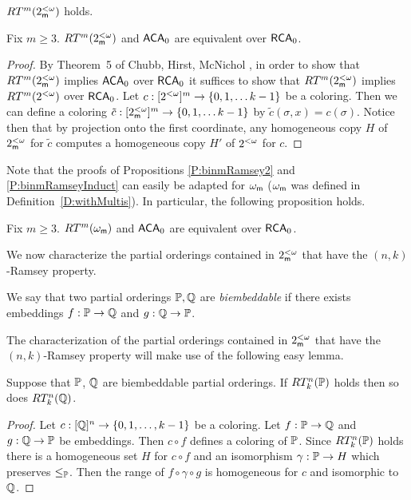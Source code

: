 \begin{cor}\label{C:binmRamsey}
$RT^m(2^{<\omega}_{\mathsf{m}})$ holds.
\end{cor}

\begin{thm}\label{T:binm&ACA}
Fix $m\geq 3$.  $RT^m(2^{<\omega}_{\mathsf{m}})$ and $\mathsf{ACA}_0$ are equivalent over $\mathsf{RCA}_0$.
\end{thm}
\begin{proof}
By Theorem~5 of Chubb, Hirst, McNichol \cite{CHM},
in order to show that $RT^m(2^{<\omega}_{\mathsf{m}})$ implies $\mathsf{ACA}_0$ over $\mathsf{RCA}_0$
it suffices to show that $RT^m(2^{<\omega}_{\mathsf{m}})$ implies $RT^m(2^{<\omega})$ over $\mathsf{RCA}_0$.
Let $c:[2^{<\omega}]^m\to\{0,1,\ldots k-1\}$ be a coloring.
Then we can define a coloring $\tilde{c}:[2^{<\omega}_{\mathsf{m}}]^m\to\{0,1,\ldots k-1\}$
by $\tilde{c}(\sigma,x)=c(\sigma)$.
Notice then that by projection onto the first coordinate,
any homogeneous copy $H$ of $2^{<\omega}_{\mathsf{m}}$ for $\tilde{c}$
computes a homogeneous copy $H'$ of $2^{<\omega}$ for $c$.
\end{proof}

Note that the proofs of Propositions \ref{P:binmRamsey2} and \ref{P:binmRamseyInduct}
can easily be adapted for $\omega_\mathsf{m}$
($\omega_\mathsf{m}$ was defined in Definition~\ref{D:withMultis}).
In particular, the following proposition holds.
\begin{prop}\label{P:omegamRamsey}
Fix $m\geq 3$.  $RT^m(\omega_\mathsf{m})$ and $\mathsf{ACA}_0$ are equivalent over $\mathsf{RCA}_0$.
\end{prop}

We now characterize the partial orderings contained in $2^{<\omega}_{\mathsf{m}}$
that have the $(n,k)$-Ramsey property.

\begin{definition}
We say that two partial orderings $\mathbb{P},\mathbb{Q}$ are \textit{biembeddable} if
there exists embeddings $f:\mathbb{P}\to\mathbb{Q}$ and $g:\mathbb{Q}\to\mathbb{P}$.
\end{definition}

The characterization of the partial orderings contained in $2^{<\omega}_{\mathsf{m}}$
that have the $(n,k)$-Ramsey property will make use of the following easy lemma.

\begin{lem}[\RCAo]\label{L:biemebedRam}
Suppose that $\mathbb{P}$, $\mathbb{Q}$ are biembeddable partial orderings.
If $RT^n_k(\mathbb{P})$ holds then so does $RT^n_k(\mathbb{Q})$.
\end{lem}

\begin{proof}
Let $c:[\mathbb{Q}]^n\to\{0,1,\ldots,k-1\}$ be a coloring.
Let $f:\mathbb{P}\to\mathbb{Q}$ and $g:\mathbb{Q}\to\mathbb{P}$ be embeddings.
Then $c\circ f$ defines a coloring of $\mathbb{P}$.
Since $RT^n_k(\mathbb{P})$ holds there is a homogeneous set $H$ for $c\circ f$
and an isomorphism $\gamma:\mathbb{P}\to H$ which preserves $\leq_{\mathbb{P}}$.
Then the range of $f\circ \gamma\circ g$ is homogeneous for $c$ and
isomorphic to $\mathbb{Q}$.
\end{proof}

